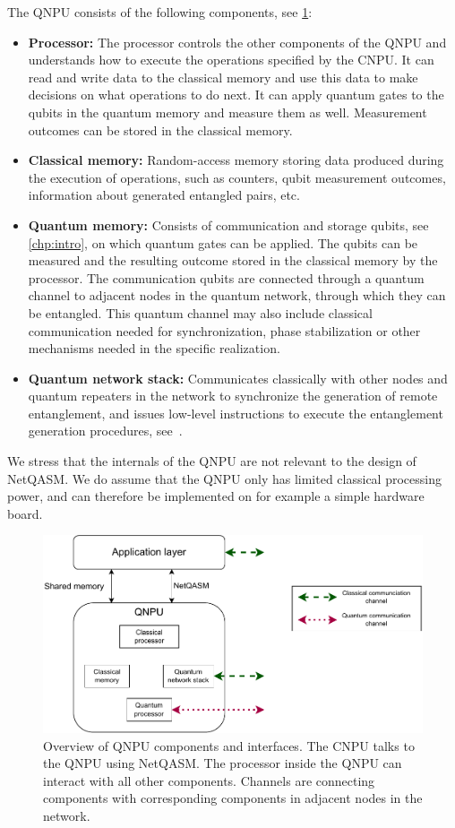 The \ac{QNPU} consists of the following components, see \cref{fig:qnpu}:
\begin{itemize}
    \item \textbf{Processor:}
            The processor controls the other components of the \ac{QNPU} and understands how to execute the operations specified by the \ac{CNPU}.
            It can read and write data to the classical memory and use this data to make decisions on what operations to do next.
            It can apply quantum gates to the qubits in the quantum memory and measure them as well.
            Measurement outcomes can be stored in the classical memory.
    \item \textbf{Classical memory:}
            Random-access memory storing data produced during the execution of operations, such as counters, qubit measurement outcomes, information about generated entangled pairs, etc.
    \item \textbf{Quantum memory:}
            Consists of communication and storage qubits, see \cref{chp:intro}, on which quantum gates can be applied.
            The qubits can be measured and the resulting outcome stored in the classical memory by the processor.
            The communication qubits are connected through a quantum channel to adjacent nodes in the quantum network, through which they can be entangled.
            This quantum channel may also include classical communication needed for synchronization, phase stabilization or other mechanisms needed in the specific realization.
    \item \textbf{Quantum network stack:}
            Communicates classically with other nodes and quantum repeaters in the network to synchronize the generation of remote entanglement, and issues low-level instructions to execute the entanglement generation procedures, see~\cite{dahlberg2019linklayer,kozlowski2020networklayer}.
\end{itemize}

We stress that the internals of the \ac{QNPU} are not relevant to the design of \ac{NetQASM}.
We do assume that the \ac{QNPU} only has limited classical processing power, and can therefore be implemented on for example a simple hardware board.


\begin{figure}[t]
    \centering
    \includegraphics[width=0.6\linewidth]{figures/netqasm/qnpu.pdf}
    \caption{Overview of \ac{QNPU} components and interfaces. The \ac{CNPU} talks to
        the \ac{QNPU} using \ac{NetQASM}. The processor inside the \ac{QNPU} can interact with
        all other components. Channels are connecting components with corresponding
        components in adjacent nodes in the network.}
    \label{fig:qnpu}
\end{figure}



